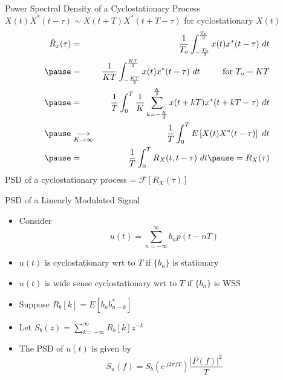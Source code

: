 \documentclass[t]{beamer}
\begin{document}
\begin{frame}{Power Spectral Density of a Cyclostationary Process}
  \footnotesize
  $X(t)X^*(t-\tau) \sim X(t+T)X^*(t+T-\tau)$ for cyclostationary $X(t)$
  \begin{eqnarray*}
    \hat{R}_x(\tau) & = & \frac{1}{T_o} \int_{-\frac{T_o}{2}}^{\frac{T_o}{2}} x(t)x^*(t-\tau) \ dt \\
    \pause
                    & = & \frac{1}{KT} \int_{-\frac{KT}{2}}^{\frac{KT}{2}} x(t)x^*(t-\tau) \ dt \ \ \ \ \ \ \ \   \text{for } T_o = KT\\
    \pause
                    & = & \frac{1}{T} \int_{0}^{T} \frac{1}{K} \sum_{k=-\frac{K}{2}}^{\frac{K}{2}}x(t+kT)x^*(t+kT-\tau) \ dt  \\
    \pause
                    & \underset{K \rightarrow \infty}{\longrightarrow} & \frac{1}{T} \int_{0}^{T} E\left[X(t)X^*(t-\tau)\right] \ dt  \\
    \pause
                    & = & \frac{1}{T} \int_{0}^{T} R_X(t,t-\tau) \ dt  \pause = R_X(\tau)
  \end{eqnarray*}
  \pause
  PSD of a cyclostationary process = $\mathcal{F}[R_X(\tau)]$ 
  \normalsize
\end{frame}

\begin{frame}{PSD of a Linearly Modulated Signal}
  \footnotesize
  \begin{itemize}
    \item Consider
      \begin{equation*}
        u(t) = \sum_{n=-\infty}^{\infty} b_n p(t-nT)
      \end{equation*}
    \pause
    \item $u(t)$ is cyclostationary wrt to $T$ if $\{b_n\}$ is stationary
    \pause
    \item $u(t)$ is wide sense cyclostationary wrt to $T$ if $\{b_n\}$ is WSS
    \pause
    \item Suppose $R_b[k] = E[b_{n} b_{n-k}^*]$
    \pause
    \item Let $S_b(z) = \sum_{k=-\infty}^{\infty} R_b[k]z^{-k}$
    \pause
    \item The PSD of $u(t)$ is given by
      \begin{equation*}
        S_u(f) = S_b\left(e^{\ j2\pi fT}\right)\frac{\lvert P(f)\rvert^2}{T}
      \end{equation*}
  \end{itemize}
  \normalsize
\end{frame}
\end{document}

